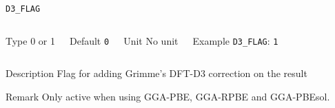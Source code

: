 \begin{frame}[allowframebreaks]{\texttt{D3\_FLAG}} \label{D3_FLAG}
\vspace*{-12pt}
\begin{columns}
\begin{block}{Type}
0 or 1
\end{block}

\begin{block}{Default}
\texttt{0}
\end{block}

\begin{block}{Unit}
No unit
\end{block}

\begin{block}{Example}
\texttt{D3\_FLAG}: \texttt{1}
\end{block}
\end{columns}

\begin{block}{Description}
Flag for adding Grimme’s DFT-D3 correction on the result
\end{block}

\begin{block}{Remark}
Only active when using GGA-PBE, GGA-RPBE and GGA-PBEsol.
\end{block}

\end{frame}


